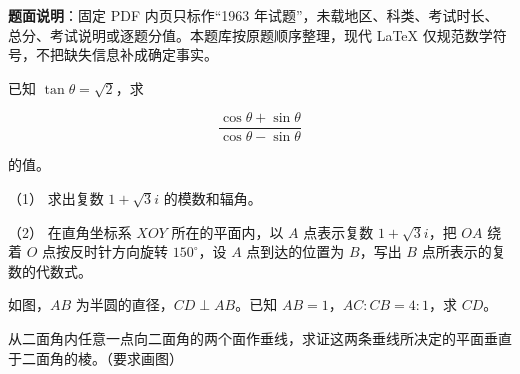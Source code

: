 

\begin{gktip}
\textbf{题面说明}：固定 PDF 内页只标作“1963 年试题”，未载地区、科类、考试时长、总分、考试说明或逐题分值。本题库按原题顺序整理，现代 LaTeX 仅规范数学符号，不把缺失信息补成确定事实。
\end{gktip}


\begin{question}
已知 $\tan\theta=\sqrt2$，求

\nopagebreak[4]
\[
\frac{\cos\theta+\sin\theta}{\cos\theta-\sin\theta}
\]

的值。

\end{question}
\begin{question}

（1） 求出复数 $1+\sqrt3i$ 的模数和辐角。

（2） 在直角坐标系 $XOY$ 所在的平面内，以 $A$ 点表示复数 $1+\sqrt3i$，把 $OA$ 绕着 $O$ 点按反时针方向旋转 $150^\circ$，设 $A$ 点到达的位置为 $B$，写出 $B$ 点所表示的复数的代数式。

\Needspace{0.4\textheight}
\end{question}
\begin{question}
如图，$AB$ 为半圆的直径，$CD\perp AB$。已知 $AB=1$，$AC:CB=4:1$，求 $CD$。
\nopagebreak[4]
\begin{center}\end{center}
\nopagebreak[4]
\end{question}
\begin{question}
从二面角内任意一点向二面角的两个面作垂线，求证这两条垂线所决定的平面垂直于二面角的棱。（要求画图）

\end{question}
